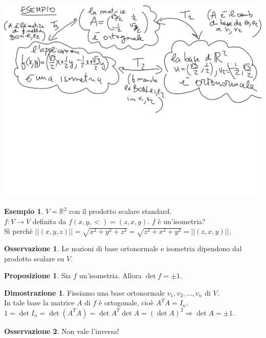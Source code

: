\documentclass[a4paper]{article}
\theoremstyle{definition}
\newtheorem*{oss}{Osservazione}
\newtheorem*{dimm}{Dimostrazione}
\newtheorem*{es}{Esempio}
\newtheorem*{prop}{Proposizione}
\begin{document}
	\begin{center}
		\includegraphics[width=\linewidth]{images/es_teo_ortonormale.png}
	\end{center}
	\begin{es}
		$V = \mathbb{R}^2$ con il prodotto scalare standard. \\
		$f: V \to V$ definita da $f(x, y, <) = (z, x, y)$. $f$ è un'isometria? \\
		Sì perchè $||(x, y, z)|| = \sqrt{x^2 + y^2 + z^2} = \sqrt{z^2 + x^2 + y^2} = ||(z, x, y)||$.
	\end{es}

	\begin{oss}
		Le nozioni di base ortonormale e isometria dipendono dal prodotto scalare su $V$.
	\end{oss}

	\begin{prop}
		Sia $f$ un'isometria. Allora $\det f = \pm 1$.
	\end{prop}

	\begin{dimm}
		Fissiamo una base ortonormale $v_1, v_2, ..., v_n$ di $V$. \\
		In tale base la matrice $A$ di $f$ è ortogonale, cioè $A^TA = I_n$. \\
		$1 = \det I_n = \det(A^TA) = \det A^T \det A = (\det A)^2 \Rightarrow \det A = \pm 1$.
	\end{dimm}

	\begin{oss}
		Non vale l'inversa!
	\end{oss}
\end{document}
